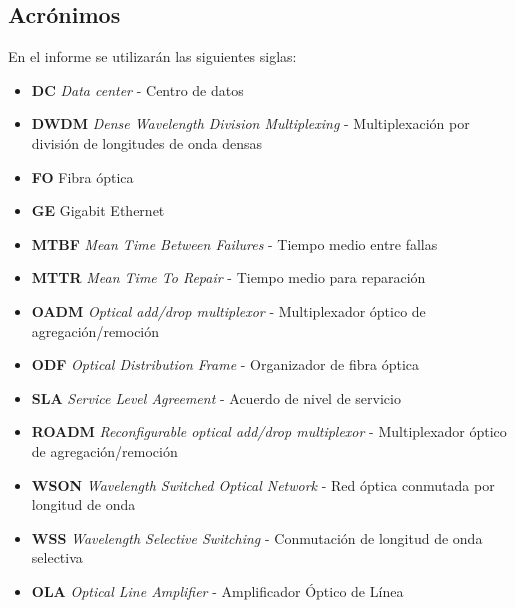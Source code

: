 \subsection{Acrónimos}
\label{sec:acronimos}

En el informe se utilizarán las siguientes siglas:
\begin{itemize}
\item \textbf{DC} \emph{Data center} - Centro de datos
\item \textbf{DWDM} \emph{Dense Wavelength Division Multiplexing} - Multiplexación por división de longitudes de onda densas
\item \textbf{FO} Fibra óptica
\item \textbf{GE} Gigabit Ethernet
\item \textbf{MTBF} \emph{Mean Time Between Failures} - Tiempo medio entre fallas
\item \textbf{MTTR} \emph{Mean Time To Repair} - Tiempo medio para reparación
\item \textbf{OADM} \emph{Optical add/drop multiplexor} - Multiplexador óptico de agregación/remoción
\item \textbf{ODF} \emph{Optical Distribution Frame} - Organizador de fibra óptica
\item \textbf{SLA} \emph{Service Level Agreement} - Acuerdo de nivel de servicio
\item \textbf{ROADM} \emph{Reconfigurable optical add/drop multiplexor} - Multiplexador óptico de agregación/remoción
\item \textbf{WSON} \emph{Wavelength Switched Optical Network} - Red óptica conmutada por longitud de onda
\item \textbf{WSS} \emph{Wavelength Selective Switching} - Conmutación de longitud de onda selectiva
\item \textbf{OLA} \emph{Optical Line Amplifier} - Amplificador Óptico de Línea
\end{itemize}